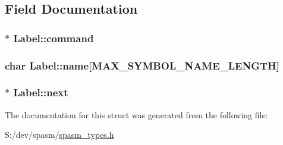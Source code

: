 \subsection{\-Field \-Documentation}
\hypertarget{struct_label_aeaf8698a75695ec399c3ce02c7804fae}{
\subsubsection[{command}]{$\ast$ {\bf \-Label\-::command}}}
\label{struct_label_aeaf8698a75695ec399c3ce02c7804fae}
\hypertarget{struct_label_a96e0274a8d36db81d857e9536c8d94e5}{
\subsubsection[{name}]{\setlength{\rightskip}{0pt plus 5cm}char {\bf \-Label\-::name}\mbox{[}\-M\-A\-X\-\_\-\-S\-Y\-M\-B\-O\-L\-\_\-\-N\-A\-M\-E\-\_\-\-L\-E\-N\-G\-T\-H\mbox{]}}}
\label{struct_label_a96e0274a8d36db81d857e9536c8d94e5}
\hypertarget{struct_label_aba70a946336559c889fe6a5a3e43f785}{
\subsubsection[{next}]{$\ast$ {\bf \-Label\-::next}}}
\label{struct_label_aba70a946336559c889fe6a5a3e43f785}


\-The documentation for this struct was generated from the following file\-:\begin{DoxyCompactItemize}
\item 
\-S\-:/dev/spasm/\hyperlink{spasm__types_8h}{spasm\-\_\-types.\-h}\end{DoxyCompactItemize}
